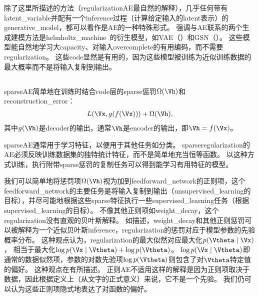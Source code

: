 除了这里所描述的方法（\gls{regularization}\gls{AE}最自然的解释），几乎任何带有\gls{latent_variable}并配有一个\gls{inference}过程（计算给定输入的\gls{latent}表示）的\gls{generative_model}，都可以看作是\gls{AE}的一种特殊形式。
强调与\gls{AE}联系的两个生成建模方法是\gls{helmholtz_machine}~\citep{Hinton95}的衍生模型，如\gls{VAE}（）和\gls{GSN}（）。
这些模型能自然地学习大\gls{capacity}、对输入\gls{overcomplete}的有用编码，而不需要\gls{regularization}。
这些\gls{code}显然是有用的，因为这些模型被训练为近似训练数据的最大概率而不是将输入复制到输出。


\subsection{}
\label{sec:sparse_autoencoders}
\gls{sparse}\gls{AE}简单地在训练时结合\gls{code}层的\gls{sparse}惩罚$\Omega(\Vh)$和\gls{reconstruction_error}：
\begin{align}
    L(\Vx, g(f(\Vx))) + \Omega(\Vh),
\end{align}
其中$g(\Vh)$是\gls{decoder}的输出，通常$\Vh$是\gls{encoder}的输出，即$\Vh = f(\Vx)$。


\gls{sparse}\gls{AE}通常用于学习特征，以便用于其他任务如分类。
\gls{sparse}\gls{regularization}的\gls{AE}必须反映训练数据集的独特统计特征，而不是简单地充当恒等函数。
以这种方式训练，执行附带\gls{sparse}惩罚的复制任务可以得到能学习有用特征的模型。


我们可以简单地将惩罚项$\Omega(\Vh)$视为加到\gls{feedforward_network}的正则项，这个\gls{feedforward_network}的主要任务是将输入复制到输出（\gls{unsupervised_learning}的目标），并尽可能地根据这些\gls{sparse}特征执行一些\gls{supervised_learning}任务（根据\gls{supervised_learning}的目标）。
不像其他正则项如\gls{weight_decay}，这个\gls{regularization}没有直观的贝叶斯解释。
如描述，\gls{weight_decay}和其他正则惩罚可以被解释为一个近似贝叶斯\gls{inference}，\gls{regularization}的惩罚对应于模型参数的先验概率分布。
这种观点认为，\gls{regularization}的最大似然对应最大化$p(\Vtheta \mid \Vx)$， 相当于最大化$\log p(\Vx \mid \Vtheta) + \log p(\Vtheta)$。 $\log p(\Vx \mid \Vtheta)$即通常的数据似然项，参数的对数先验项$\log p(\Vtheta)$则包含了对$\Vtheta$特定值的偏好。
这种观点在有所描述。
正则\gls{AE}不适用这样的解释是因为正则项取决于数据，因此根据定义上（从文字的正式意义）来说，它不是一个先验。
我们仍可以认为这些正则项隐式地表达了对函数的偏好。

